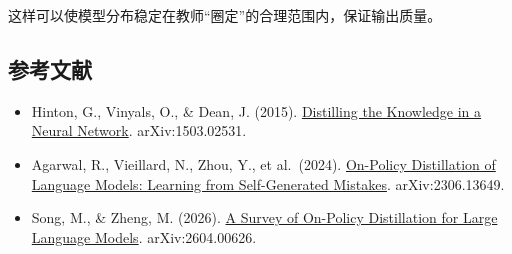 这样可以使模型分布稳定在教师``圈定''的合理范围内，保证输出质量。

\FloatBarrier
{}
\hypertarget{ux53c2ux8003ux6587ux732e-89}{%
\subsection{参考文献}\label{ux53c2ux8003ux6587ux732e-89}}

\vspace{0.25em}
\begin{itemize}
\tightlist
\item
  Hinton, G., Vinyals, O., \& Dean, J. (2015). \href{https://arxiv.org/abs/1503.02531}{Distilling the Knowledge in a Neural Network}. arXiv:1503.02531.
\item
  Agarwal, R., Vieillard, N., Zhou, Y., et al.~(2024). \href{https://arxiv.org/abs/2306.13649}{On-Policy Distillation of Language Models: Learning from Self-Generated Mistakes}. arXiv:2306.13649.
\item
  Song, M., \& Zheng, M. (2026). \href{https://arxiv.org/abs/2604.00626}{A Survey of On-Policy Distillation for Large Language Models}. arXiv:2604.00626.
\end{itemize}

\clearpage
